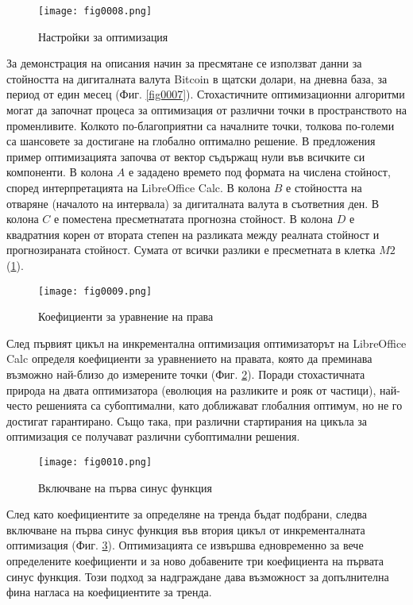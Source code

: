 \begin{figure}[H]
  \centering
  \texttt{[image: fig0008.png]}
  \caption{Настройки за оптимизация}
\label{fig0008}
\end{figure}

За демонстрация на описания начин за пресмятане се използват данни за стойността на дигиталната валута Bitcoin в щатски долари, на дневна база, за период от един месец (Фиг. \ref{fig0007}). Стохастичните оптимизационни алгоритми могат да започнат процеса за оптимизация от различни точки в пространството на променливите. Колкото по-благоприятни са началните точки, толкова по-големи са шансовете за достигане на глобално оптимално решение. В предложения пример оптимизацията започва от вектор съдържащ нули във всичките си компоненти. В колона $A$ е зададено времето под формата на числена стойност, според интерпретацията на LibreOffice Calc. В колона $B$ е стойността на отваряне (началото на интервала) за дигиталната валута в съответния ден. В колона $C$ е поместена пресметнатата прогнозна стойност. В колона $D$ е квадратния корен от втората степен на разликата между реалната стойност и прогнозираната стойност. Сумата от всички разлики е пресметната в клетка $M2$ (\ref{fig0008}).

\begin{figure}[H]
  \centering
  \texttt{[image: fig0009.png]}
  \caption{Коефициенти за уравнение на права}
\label{fig0009}
\end{figure}

След първият цикъл на инкрементална оптимизация оптимизаторът на LibreOffice Calc определя коефициенти за уравнението на правата, която да преминава възможно най-близо до измерените точки (Фиг. \ref{fig0009}). Поради стохастичната природа на двата оптимизатора (еволюция на разликите и рояк от частици), най-често решенията са субоптимални, като доближават глобалния оптимум, но не го достигат гарантирано. Също така, при различни стартирания на цикъла за оптимизация се получават различни субоптимални решения. 

\begin{figure}[H]
  \centering
  \texttt{[image: fig0010.png]}
  \caption{Включване на първа синус функция}
\label{fig0010}
\end{figure}

След като коефициентите за определяне на тренда бъдат подбрани, следва включване на първа синус функция във втория цикъл от инкременталната оптимизация (Фиг. \ref{fig0010}). Оптимизацията се извършва едновременно за вече определените коефициенти и за ново добавените три коефициента на първата синус функция. Този подход за надграждане дава възможност за допълнителна фина нагласа на коефициентите за тренда. 

